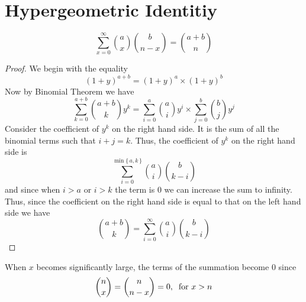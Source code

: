 \section{Hypergeometric Identitiy}
\[
    \sum_{x = 0}^{\infty} \binom{a}{x} \binom{b}{n-x} = \binom{a + b}{n}
\]
\begin{proof}
We begin with the equality
\[
    (1 + y)^{a + b} = (1 + y)^a \times (1 + y)^b
\]
Now by Binomial Theorem we have
\[
    \sum_{k = 0}^{a + b} \binom{a + b}{k} y^k = \sum_{i = 0}^{a} \binom{a}{i} y^i \times \sum_{j = 0}^{b} \binom{b}{j} y^j
\]
Consider the coefficient of $y^k$ on the right hand side. It is the sum of all the binomial terms such that $i + j = k$. Thus, the coefficient of $y^k$ on the right hand side is
\[
    \sum_{i = 0}^{\min\{\, a,k \,\}} \binom{a}{i} \binom{b}{k-i}
\]
and since when $i > a$ or $i > k$ the term is 0 we can increase the sum to infinity. Thus, since the coefficient on the right hand side is equal to that on the left hand side we have
\[
    \binom{a + b}{k} = \sum_{i = 0}^{\infty} \binom{a}{i} \binom{b}{k-i}
\]
\end{proof}
\begin{info}
When $x$ becomes significantly large, the terms of the summation become 0 since 
\[
    \binom{n}{x} = \binom{n}{n-x} = 0,\:\text{ for } x > n
\]
\end{info}
